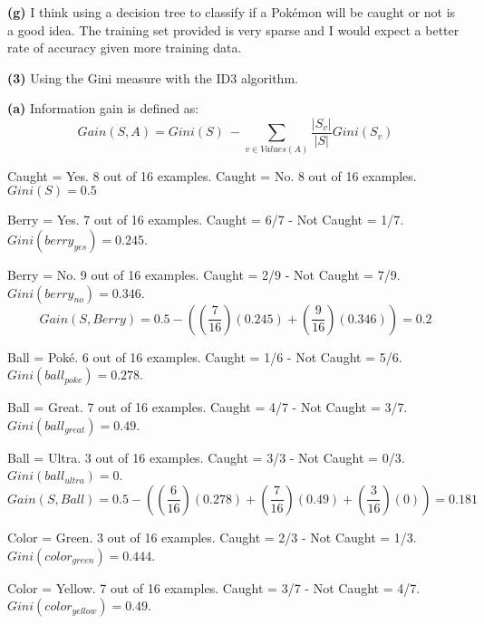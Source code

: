 \documentclass[11pt]{article}
\renewcommand\part[1]{\vspace{.10in}\textbf{(#1)}}
\begin{document}
\part{g} I think using a decision tree to classify if a Pok\'{e}mon will be caught or not is a good idea. The training set provided is very sparse and I would expect a better rate of accuracy given more training data.

\part{3} Using the Gini measure with the ID3 algorithm.

\qquad \part{a} Information gain is defined as:
$$Gain(S, A) = Gini(S)\  - \sum_{v\in Values(A)} \frac{|S_v|}{|S|} Gini(S_v)$$

Caught = Yes. 8 out of 16 examples. Caught = No. 8 out of 16 examples. $Gini(S) = 0.5$ \newline

Berry = Yes. 7 out of 16 examples. Caught = 6/7 - Not Caught = 1/7. $Gini(berry_{yes}) = 0.245$.
 
Berry = No. 9 out of 16 examples. Caught = 2/9 - Not Caught = 7/9. $Gini(berry_{no}) = 0.346$.
$$Gain(S, Berry) = 0.5 - ((\frac{7}{16})(0.245) + (\frac{9}{16})(0.346)) = 0.2$$

 \par

Ball = Pok\'{e}. 6 out of 16 examples. Caught = 1/6 - Not Caught = 5/6. $Gini(ball_{poke}) = 0.278$.

Ball = Great. 7 out of 16 examples. Caught = 4/7 - Not Caught = 3/7. $Gini(ball_{great}) = 0.49$.

Ball = Ultra. 3 out of 16 examples. Caught = 3/3 - Not Caught = 0/3. $Gini(ball_{ultra}) = 0$.
$$Gain(S, Ball) = 0.5 - ((\frac{6}{16})(0.278) + (\frac{7}{16})(0.49) + (\frac{3}{16})(0)) = 0.181$$

 \par
\newpage

Color = Green. 3 out of 16 examples. Caught = 2/3 - Not Caught = 1/3. $Gini(color_{green}) = 0.444$.

Color = Yellow. 7 out of 16 examples. Caught = 3/7 - Not Caught = 4/7. $Gini(color_{yellow}) = 0.49$.
\end{document}
